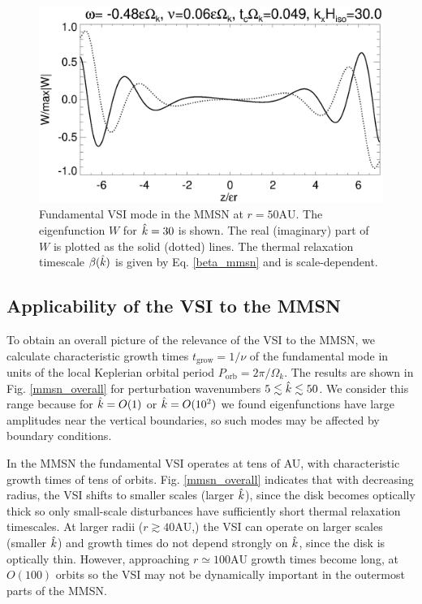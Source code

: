 \begin{figure}
   \includegraphics[width=\linewidth,clip=true,trim=0cm 0.0cm 0cm
  0cm]{figures/eigenvectorW_mmsnkx30.ps}
  \caption{Fundamental VSI mode in the MMSN at 
    $r=50\mathrm{AU}$. The eigenfunction $W$ for $\hat{k}=30$ is shown. The real (imaginary)
    part of $W$ is plotted as the solid (dotted)
    lines. The thermal relaxation timescale $\beta(\hat{k})$ is given by
    Eq. \ref{beta_mmsn} and is scale-dependent. \label{mmsn_eigenW}}    
\end{figure}

\subsection{Applicability of the VSI to the MMSN}
To obtain an overall picture of the relevance of the VSI to the MMSN,
we calculate characteristic growth times $t_\mathrm{grow} = 1/\nu$ of 
the fundamental mode in units of the local Keplerian orbital period
$P_\mathrm{orb}= 2\pi/\Omega_k$. The results are shown in 
Fig. \ref{mmsn_overall} for perturbation wavenumbers $5\lesssim
\hat{k}\lesssim 50$. We consider this range because for  
$\hat{k}=O(1)$ or $\hat{k}=O(10^2)$ we found eigenfunctions have large
amplitudes near the vertical boundaries, so such modes may be affected
by boundary conditions. 

In the MMSN the fundamental VSI operates at tens of AU, with
characteristic growth times of tens of orbits. %
Fig. \ref{mmsn_overall} indicates that with decreasing radius, the VSI
shifts to smaller scales (larger $\hat{k}$), since the disk becomes optically
thick so only small-scale disturbances have sufficiently short thermal
relaxation timescales. At larger radii ($r\gtrsim 
40\mathrm{AU}$,) the VSI can operate on larger scales (smaller
$\hat{k}$) and growth times do not depend strongly on
$\hat{k}$, since the disk is optically thin. However, approaching
$r\simeq 100\mathrm{AU}$ growth times become long, at $O(100)$ orbits so
the VSI may not be dynamically important in the outermost parts of the
MMSN. 

